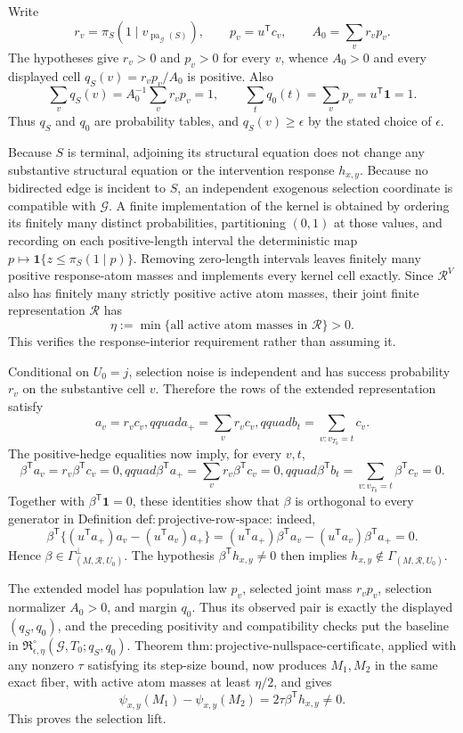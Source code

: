 Write
\[
 r_v=\pi_S(1\mid v_{\operatorname{pa}_{\mathcal G}(S)}),
 \qquad p_v=u^{\mathsf T}c_v,
 \qquad A_0=\sum_v r_vp_v.
\]
The hypotheses give \(r_v>0\) and \(p_v>0\) for every \(v\), whence \(A_0>0\) and every displayed cell \(q_S(v)=r_vp_v/A_0\) is positive.  Also
\[
 \sum_v q_S(v)=A_0^{-1}\sum_vr_vp_v=1,
 \qquad
 \sum_tq_0(t)=\sum_vp_v=u^{\mathsf T}\mathbf 1=1.
\]
Thus \(q_S\) and \(q_0\) are probability tables, and \(q_S(v)\geq\epsilon\) by the stated choice of \(\epsilon\).

Because \(S\) is terminal, adjoining its structural equation does not change any substantive structural equation or the intervention response \(h_{x,y}\).  Because no bidirected edge is incident to \(S\), an independent exogenous selection coordinate is compatible with \(\mathcal G\).  A finite implementation of the kernel is obtained by ordering its finitely many distinct probabilities, partitioning \((0,1)\) at those values, and recording on each positive-length interval the deterministic map \(p\mapsto\mathbf 1\{z\leq\pi_S(1\mid p)\}\).  Removing zero-length intervals leaves finitely many positive response-atom masses and implements every kernel cell exactly.  Since \(\mathcal R^{V}\) also has finitely many strictly positive active atom masses, their joint finite representation \(\mathcal R\) has
\[
 \eta:=\min\{\text{all active atom masses in }\mathcal R\}>0.
\]
This verifies the response-interior requirement rather than assuming it.

Conditional on \(U_0=j\), selection noise is independent and has success probability \(r_v\) on the substantive cell \(v\).  Therefore the rows of the extended representation satisfy
\[
 a_v=r_vc_v,qquad
 a_+=\sum_vr_vc_v,qquad
 b_t=\sum_{v:v_{T_0}=t}c_v.
\]
The positive-hedge equalities now imply, for every \(v,t\),
\[
 \beta^{\mathsf T}a_v=r_v\beta^{\mathsf T}c_v=0,qquad
 \beta^{\mathsf T}a_+=\sum_vr_v\beta^{\mathsf T}c_v=0,qquad
 \beta^{\mathsf T}b_t=\sum_{v:v_{T_0}=t}\beta^{\mathsf T}c_v=0.
\]
Together with \(\beta^{\mathsf T}\mathbf 1=0\), these identities show that \(\beta\) is orthogonal to every generator in Definition \(\mathrm{def{:}projective\text{-}row\text{-}space}\): indeed,
\[
 \beta^{\mathsf T}\bigl\{(u^{\mathsf T}a_+)a_v-(u^{\mathsf T}a_v)a_+\bigr\}
 =(u^{\mathsf T}a_+)\beta^{\mathsf T}a_v-(u^{\mathsf T}a_v)\beta^{\mathsf T}a_+=0.
\]
Hence \(\beta\in\Gamma_{(M,\mathcal R,U_0)}^{\perp}\).  The hypothesis \(\beta^{\mathsf T}h_{x,y}\neq0\) then implies \(h_{x,y}\notin\Gamma_{(M,\mathcal R,U_0)}\).

The extended model has population law \(p_v\), selected joint mass \(r_vp_v\), selection normalizer \(A_0>0\), and margin \(q_0\).  Thus its observed pair is exactly the displayed \((q_S,q_0)\), and the preceding positivity and compatibility checks put the baseline in \(\mathfrak R_{\epsilon,\eta}^{\circ}(\mathcal G,T_0;q_S,q_0)\).  Theorem \(\mathrm{thm{:}projective\text{-}nullspace\text{-}certificate}\), applied with any nonzero \(\tau\) satisfying its step-size bound, now produces \(M_1,M_2\) in the same exact fiber, with active atom masses at least \(\eta/2\), and gives
\[
 \psi_{x,y}(M_1)-\psi_{x,y}(M_2)
 =2\tau\beta^{\mathsf T}h_{x,y}\neq0.
\]
This proves the selection lift.